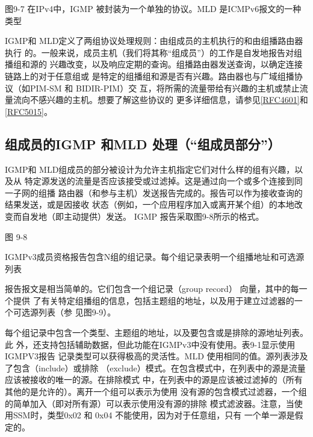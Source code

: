 图9-7 在IPv4中，IGMP 被封装为一个单独的协议。MLD 是ICMPv6报文的一种类型

IGMP和 MLD定义了两组协议处理规则：由组成员的主机执行的和由组播路由器执行
的。一般来说，成员主机（我们将其称“组成员”）的工作是自发地报告对组播组和源的
兴趣改变，以及响应定期的查询。组播路由器发送查询，以确定连接链路上的对于任意组或
是特定的组播组和源是否有兴趣。路由器也与广域组播协议（如PIM-SM 和 BIDIR-PIM）交
互，将所需的流量带给有兴趣的主机或禁止流量流向不感兴趣的主机。想要了解这些协议的
更多详细信息，请参见\href{https://www.rfc-editor.org/rfc/rfc4601}{[RFC4601]}和 \href{https://www.rfc-editor.org/rfc/rfc5015}{[RFC5015]}。

\subsection{组成员的IGMP 和MLD 处理（“组成员部分”）}
IGMP和 MLD组成员的部分被设计为允许主机指定它们对什么样的组有兴趣，以及从
特定源发送的流量是否应该接受或过滤掉。这是通过向一个或多个连接到同一子网的组播
路由器（和参与主机）发送报告完成的。报告可以作为接收查询的结果发送，或是因接收
状态（例如，一个应用程序加入或离开某个组）的本地改变而自发地（即主动提供）发送。
IGMP 报告采取图9-8所示的格式。

图 9-8

IGMPv3成员资格报告包含N组的组记录。每个组记录表明一个组播地址和可选源列表

报告报文是相当简单的。它们包含一个组记录（group record） 向量，其中的每一个提供
了有关特定组播组的信息，包括主题组的地址，以及用于建立过滤器的一个可选源列表（参
见图9-9）。

每个组记录中包含一个类型、主题组的地址，以及要包含或是排除的源地址列表。此
外，还支持包括辅助数据，但此功能在IGMPv3中没有使用。表9-1显示使用IGMPV3报告
记录类型可以获得极高的灵活性。MLD 使用相同的值。源列表涉及了包含（include）或排除
（exclude）模式。在包含模式中，在列表中的源是流量应该被接收的唯一的源。在排除模式
中，在列表中的源是应该被过滤掉的（所有其他的是允许的）。离开一个组可以表示为使用
没有源的包含模式过滤器，一个组的简单加入（即对所有源）可以表示使用没有源的排除
模式滤波器。注意，当使用SSM时，类型0x02 和 0x04 不能使用，因为对于任意组，只有
一个单一源是假定的。


